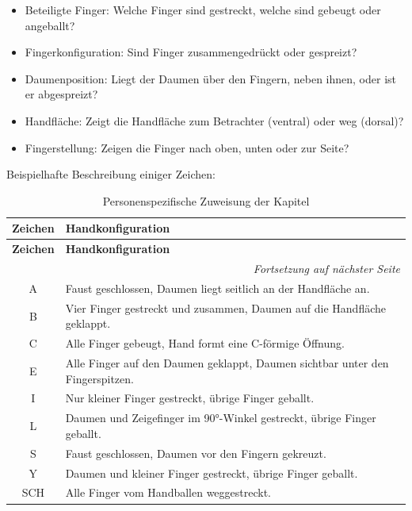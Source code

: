 \begin{itemize}
    \item Beteiligte Finger: Welche Finger sind gestreckt, welche sind gebeugt oder angeballt?
    \item Fingerkonfiguration: Sind Finger zusammengedrückt oder gespreizt?
    \item Daumenposition: Liegt der Daumen über den Fingern, neben ihnen, oder ist er abgespreizt?
    \item Handfläche: Zeigt die Handfläche zum Betrachter (ventral) oder weg (dorsal)?
    \item Fingerstellung: Zeigen die Finger nach oben, unten oder zur Seite?
\end{itemize}

Beispielhafte Beschreibung einiger Zeichen:

\begin{longtable}{|c|p{}|}
    \hline
    \textbf{Zeichen} & \textbf{Handkonfiguration} \\
    \hline
    \endfirsthead

    \hline
    \textbf{Zeichen} & \textbf{Handkonfiguration} \\
    \hline
    \endhead

    \hline
    \multicolumn{2}{r}{\textit{Fortsetzung auf nächster Seite}} \\
    \endfoot
    \caption{Personenspezifische Zuweisung der Kapitel}
    \label{tab:kapitelzuweisung}
    \endlastfoot

    A & Faust geschlossen, Daumen liegt seitlich an der Handfläche an. \\
    \hline
    B & Vier Finger gestreckt und zusammen, Daumen auf die Handfläche geklappt. \\
    \hline
    C & Alle Finger gebeugt, Hand formt eine C-förmige Öffnung. \\
    \hline
    E & Alle Finger auf den Daumen geklappt, Daumen sichtbar unter den Fingerspitzen. \\
    \hline
    I & Nur kleiner Finger gestreckt, übrige Finger geballt. \\
    \hline
    L & Daumen und Zeigefinger im 90°-Winkel gestreckt, übrige Finger geballt. \\
    \hline
    S & Faust geschlossen, Daumen vor den Fingern gekreuzt. \\
    \hline
    Y & Daumen und kleiner Finger gestreckt, übrige Finger geballt. \\
    \hline
    SCH & Alle Finger vom Handballen weggestreckt. \\
    \hline
\end{longtable}

